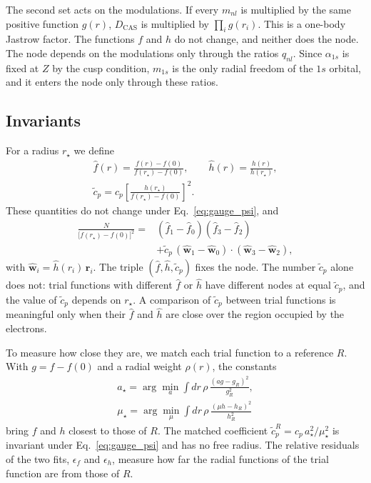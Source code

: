 \documentclass[aps,prb,reprint,amsmath,amssymb,superscriptaddress,nofootinbib]{revtex4-2}
\begin{document}
The second set acts on the modulations. If every $m_{nl}$ is multiplied by the
same positive function $g(r)$, $D_{\mathrm{CAS}}$ is multiplied by
$\prod_i g(r_i)$. This is a one-body Jastrow factor. The functions $f$ and $h$
do not change, and neither does the node. The node depends on the modulations
only through the ratios $q_{nl}$. Since $\alpha_{1s}$ is fixed at $Z$ by the
cusp condition, $m_{1s}$ is the only radial freedom of the $1s$ orbital, and it
enters the node only through these ratios.

\subsection{Invariants}
\label{ssec:invariants}

For a radius $r_\star$ we define
\begin{gather}
    \hat f(r) = \frac{f(r) - f(0)}{f(r_\star) - f(0)} , \qquad
    \hat h(r) = \frac{h(r)}{h(r_\star)} ,
    \nonumber \\
    \tilde c_p = c_p \left[ \frac{h(r_\star)}{f(r_\star) - f(0)} \right]^2 .
    \label{eq:invariants}
\end{gather}
These quantities do not change under Eq.~\eqref{eq:gauge_psi}, and
\begin{equation}
\begin{aligned}
    \frac{N}{\bigl[f(r_\star) - f(0)\bigr]^2} = {} &
        (\hat f_1 - \hat f_0)(\hat f_3 - \hat f_2) \\
        & + \tilde c_p\, (\hat{\mathbf{w}}_1 - \hat{\mathbf{w}}_0) \cdot
                       (\hat{\mathbf{w}}_3 - \hat{\mathbf{w}}_2) ,
\end{aligned}
    \label{eq:N_hat}
\end{equation}
with $\hat{\mathbf{w}}_i = \hat h(r_i)\, \mathbf{r}_i$. The triple
$(\hat f, \hat h, \tilde c_p)$ fixes the node. The number $\tilde c_p$ alone
does not: trial functions with different $\hat f$ or $\hat h$ have different
nodes at equal $\tilde c_p$, and the value of $\tilde c_p$ depends on
$r_\star$. A comparison of $\tilde c_p$ between trial functions is meaningful
only when their $\hat f$ and $\hat h$ are close over the region occupied by
the electrons.

To measure how close they are, we match each trial function to a reference
$R$. With $g = f - f(0)$ and a radial weight $\rho(r)$, the constants
\begin{gather}
    a_\star = \arg\min_a \int \! dr\, \rho\,
              \frac{(a g - g_R)^2}{g_R^2} ,
    \nonumber \\
    \mu_\star = \arg\min_\mu \int \! dr\, \rho\,
              \frac{(\mu h - h_R)^2}{h_R^2}
    \label{eq:match}
\end{gather}
bring $f$ and $h$ closest to those of $R$. The matched coefficient
$\tilde c_p^{R} = c_p\, a_\star^2/\mu_\star^2$ is invariant under
Eq.~\eqref{eq:gauge_psi} and has no free radius. The relative residuals of the
two fits, $\epsilon_f$ and $\epsilon_h$, measure how far the radial functions
of the trial function are from those of $R$.
\end{document}

